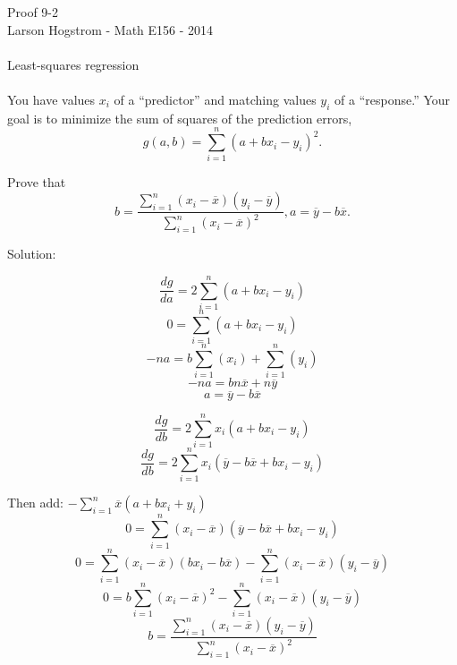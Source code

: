 \documentclass[12pt]{article}
\begin{document}
\begin{center}
Proof 9-2 \\
Larson Hogstrom - Math E156 - 2014
\end{center}

\paragraph*{}
Least-squares regression
\paragraph*{}
You have values $x_i$ of a ``predictor'' and matching values $y_i$ of a ``response.'' Your goal is to minimize the sum of squares of the prediction errors,
$$g(a,b) = \sum_{i=1}^n( a + b x_i - y_i)^2.$$

Prove that 
$$b = \frac{\sum_{i=1}^n(x_i - \overline{x})(y_i - \overline{y})} {\sum_{i=1}^n(x_i - \overline{x})^2}, a =\overline{y} - b \overline{x}.$$

Solution:

$$ \frac{dg}{da} = 2 \sum_{i=1}^n (a + bx_i - y_i)$$
$$ 0 = \sum_{i=1}^n (a + bx_i - y_i)$$
$$ -na = b \sum_{i=1}^n (x_i) + \sum_{i=1}^n (y_i) $$ 
$$ -na = bn \overline{x} +n \overline{y} $$
$$ a =\overline{y} - b \overline{x} $$

\pagebreak

$$ \frac{dg}{db} = 2 \sum_{i=1}^n x_i(a + bx_i - y_i)$$
$$ \frac{dg}{db} = 2 \sum_{i=1}^n x_i(\overline{y} - b\overline{x} + bx_i - y_i)$$

Then add:
$ - \sum_{i=1}^n \overline{x} (a + bx_i + y_i) $
$$ 0= \sum_{i=1}^n (x_i - \overline{x})(\overline{y} - b\overline{x} + bx_i - y_i)$$
$$ 0= \sum_{i=1}^n (x_i - \overline{x}) (bx_i - b\overline{x})   -  \sum_{i=1}^n (x_i - \overline{x})(y_i - \overline{y})$$
$$ 0= b \sum_{i=1}^n (x_i - \overline{x})^2  -  \sum_{i=1}^n (x_i - \overline{x})(y_i - \overline{y})$$
$$b = \frac{\sum_{i=1}^n(x_i - \overline{x})(y_i - \overline{y})} {\sum_{i=1}^n(x_i - \overline{x})^2} $$
\end{document}
